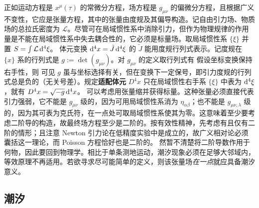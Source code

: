 正如运动方程是 $x^\mu(\tau)$ 的常微分方程，场方程是 $g_{\mu\nu}$ 的偏微分方程，且根据广义不变性，它应是张量方程，其中的张量由度规及其偏导构造。记自由引力场、物质场的总拉氏密度为 $\mathcal L$。尽管可在局域惯性系中消除引力，但作为物理规律的作用量是不能在局域惯性系中失去耦合性的，它必须是标量场。取局域惯性系 $\{\xi\}$ 并置 $S=\int \mathcal L \dd[4]{\xi}$。
体元变换 $\dd[4]x =\tilde J \dd[4]{\xi}$ 的 $\tilde J$ 能用度规行列式表示。记度规在 $\{x\}$ 系的行列式是 $g:=\det(g_{\mu\nu})$。对 $g_{\mu\nu}$ 的定义取行列式有
假设坐标变换保持右手性，则
可见 $g$ 虽与坐标选择有关，但在变换下一定保号，即引力度规的行列式总是负的（无关号差）。规定\textbf{适配体元} $D^4 x$ 只在局域惯性右手系 $\{\xi\}$ 中表为 $\dd[4]\xi$，就有 $D^4 x=\sqrt{-g}\dd[4]{x}$。
可以考虑用张量缩并获得标量。这种张量必须直接代表引力强弱，它不能是 $g_{\mu\nu}$ 级的，因为可用局域惯性系消为 $\eta_{\alpha\beta}$；也不能是 $g_{\mu\nu,\lambda}$ 级的，因为其可表为克氏符，在一点处可取局域惯性系使其为零。这意味着至少要考虑二阶导的构造，故最终场方程至少是二阶的。按有效性精神，先考虑有且仅有二阶的情形；且注意 Newton 引力论在低精度实验中是成立的，故广义相对论必须囊括这一理论，而 Poisson 方程恰好也是二阶的。
然暂不清楚将二阶导数作用于何物，因此要回到物理学。相比于单条测地运动，潮汐现象必须在足够大邻域内，等效原理不再适用。若欲寻求尽可能简单的定义，则该张量场\textit{在一点}就应具备潮汐意义。

\subsection{潮汐}

